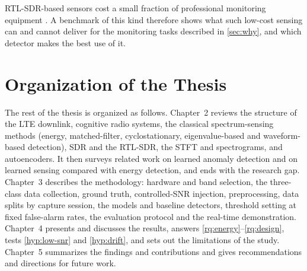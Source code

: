 RTL-SDR-based sensors cost a small fraction of professional monitoring equipment \parencite{calvopalomino2015}. A benchmark of this kind therefore shows what such low-cost sensing can and cannot deliver for the monitoring tasks described in \cref{sec:why}, and which detector makes the best use of it.

\section{Organization of the Thesis}
\label{sec:organization}

The rest of the thesis is organized as follows. Chapter~2 reviews the structure of the LTE downlink, cognitive radio systems, the classical spectrum-sensing methods (energy, matched-filter, cyclostationary, eigenvalue-based and waveform-based detection), SDR and the RTL-SDR, the STFT and spectrograms, and autoencoders. It then surveys related work on learned anomaly detection and on learned sensing compared with energy detection, and ends with the research gap. Chapter~3 describes the methodology: hardware and band selection, the three-class data collection, ground truth, controlled-SNR injection, preprocessing, data splits by capture session, the models and baseline detectors, threshold setting at fixed false-alarm rates, the evaluation protocol and the real-time demonstration. Chapter~4 presents and discusses the results, answers \ref{rq:energy}--\ref{rq:design}, tests \ref{hyp:low-snr} and \ref{hyp:drift}, and sets out the limitations of the study. Chapter~5 summarizes the findings and contributions and gives recommendations and directions for future work.
